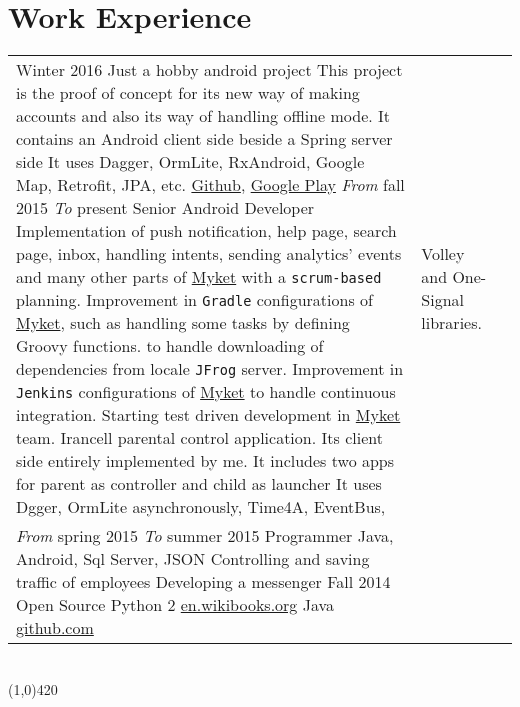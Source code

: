 \documentclass[10pt]{article}
\newcommand\HRule{\hspace*{.8cm}\line(1,0){420}\\}
\newenvironment{Record}[1]
{
    \vspace{-0.35cm}
    \section*{#1}
        \vspace{0.1cm}
        \begin{tabular}
}
{
        \end{tabular}\\
        \HRule
}
\begin{document}
\newcommand{\WorkExperienceHasinTwo}[1]{
                &       \quad\quad #1\\
}


\begin{Record}{Work Experience}{l l l}
    \WorkExperience{Free Map}
        {Winter 2016}{}
        {Just a hobby android project}
        {This project is the proof of concept for its new way of making accounts }
        {and also its way of handling offline mode.}
        {It contains an Android client side beside a Spring server side}
        {It uses Dagger, OrmLite, RxAndroid, Google Map, Retrofit, JPA, etc.}
        {\href{https://github.com/hadilq/HobbyTaste}{Github}, \href{https://play.google.com/store/apps/details?id=ir.asparsa.hobbytaste}{Google Play}}%
    \WorkExperience{\href{http://hasintech.com}{Hasin Technology}}
        {\textit{From} fall 2015}
        {\textit{To} present}
        {Senior Android Developer}
        {Implementation of push notification, help page, }
        {search page, inbox, handling intents, sending analytics' events}
        {and many other parts of \href{http://myket.ir}{Myket} with a  \texttt{scrum-based} planning.}
        {Improvement in \texttt{Gradle} configurations of \href{http://myket.ir}{Myket},}
        {such as handling some tasks by defining Groovy functions.}%
    \WorkExperienceHasinOne{Improvement in \texttt{Maven} configurations of \href{http://myket.ir}{Myket}}
        {to handle downloading of dependencies from locale \texttt{JFrog} server.}
        {Improvement in \texttt{Jenkins} configurations of \href{http://myket.ir}{Myket}}
        {to handle continuous integration.}
        {Starting test driven development in \href{http://myket.ir}{Myket} team.}
        {Irancell parental control application.}
        {Its client side entirely implemented by me.}
        {It includes two apps for parent as controller and child as launcher}
        {It uses Dgger, OrmLite asynchronously, Time4A, EventBus,}%
    \WorkExperienceHasinTwo{Volley and One-Signal libraries.}%
    \WorkExperience{\href{http://sohasys.ir}{Soha Company}}
        {\textit{From} spring 2015}
        {\textit{To} summer 2015}
        {Programmer}
        {Java, Android, Sql Server, JSON}
        {Controlling and saving traffic of employees}
        {Developing a messenger}
        {}{}%
    \WorkExperience{Persian Calendar}
        {Fall 2014}{}
        {Open Source}
        {Python 2}
        {\href{http://en.wikibooks.org/wiki/Persian_Calendar}{en.wikibooks.org}}
        {Java}
        {\href{https://github.com/hadilq/java-persian-calendar}{github.com}}{}%
\end{Record}
\end{document}
